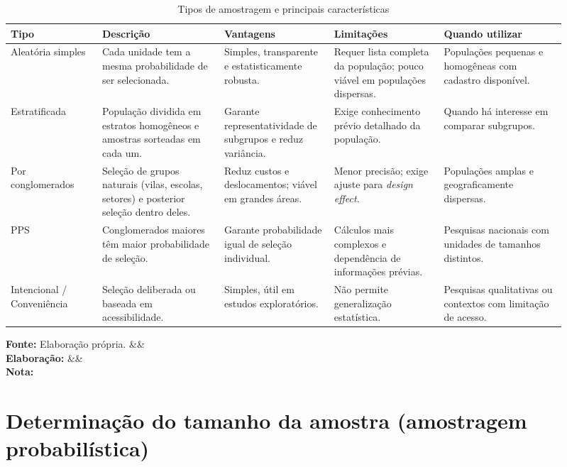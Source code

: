 \documentclass[12pt, a4paper, openany]{book}
\newcommand{\figmeta}[3]{%
  \par\vspace{4pt}%
  \begin{minipage}{\linewidth}%
  \footnotesize%
  \textbf{Fonte:} #1%
  \ifx&#2&\else\\\textbf{Elabora\c{c}\~ao:} #2\fi%
  \ifx&#3&\else\\\textbf{Nota:} #3\fi%
  \end{minipage}%
  \vspace{6pt}%
}
\begin{document}
\begin{table}[H]
\centering
\caption{Tipos de amostragem e principais caracter\'isticas}
\label{tab:tipos_amostragem}
\small
\begin{tabular}{p{0.15\linewidth} p{0.20\linewidth} p{0.18\linewidth} p{0.18\linewidth} p{0.20\linewidth}}
\toprule
\textbf{Tipo} & \textbf{Descri\c{c}\~ao} & \textbf{Vantagens} & \textbf{Limita\c{c}\~oes} & \textbf{Quando utilizar} \\
\midrule
Aleat\'oria simples & Cada unidade tem a mesma probabilidade de ser selecionada. & Simples, transparente e estatisticamente robusta. & Requer lista completa da popula\c{c}\~ao; pouco vi\'avel em popula\c{c}\~oes dispersas. & Popula\c{c}\~oes pequenas e homog\^eneas com cadastro dispon\'ivel. \\
\midrule
Estratificada & Popula\c{c}\~ao dividida em estratos homog\^eneos e amostras sorteadas em cada um. & Garante representatividade de subgrupos e reduz vari\^ancia. & Exige conhecimento pr\'evio detalhado da popula\c{c}\~ao. & Quando h\'a interesse em comparar subgrupos. \\
\midrule
Por conglomerados & Sele\c{c}\~ao de grupos naturais (vilas, escolas, setores) e posterior sele\c{c}\~ao dentro deles. & Reduz custos e deslocamentos; vi\'avel em grandes \'areas. & Menor precis\~ao; exige ajuste para \textit{design effect}. & Popula\c{c}\~oes amplas e geograficamente dispersas. \\
\midrule
PPS & Conglomerados maiores t\^em maior probabilidade de sele\c{c}\~ao. & Garante probabilidade igual de sele\c{c}\~ao individual. & C\'alculos mais complexos e depend\^encia de informa\c{c}\~oes pr\'evias. & Pesquisas nacionais com unidades de tamanhos distintos. \\
\midrule
Intencional / Conveni\^encia & Sele\c{c}\~ao deliberada ou baseada em acessibilidade. & Simples, \'util em estudos explorat\'orios. & N\~ao permite generaliza\c{c}\~ao estat\'istica. & Pesquisas qualitativas ou contextos com limita\c{c}\~ao de acesso. \\
\bottomrule
\end{tabular}
\figmeta{Elabora\c{c}\~ao pr\'opria.}{}{}
\end{table}

\section{Determina\c{c}\~ao do tamanho da amostra (amostragem probabil\'istica)}
\end{document}
